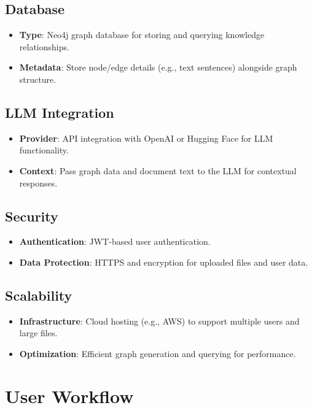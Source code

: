 \documentclass[%
 reprint,
 amsmath,amssymb,
 aps,
]{revtex4-2}
\begin{document}
\subsection{\label{sec:database}Database}
\begin{itemize}
\item \textbf{Type}: Neo4j graph database for storing and querying knowledge relationships.
\item \textbf{Metadata}: Store node/edge details (e.g., text sentences) alongside graph structure.
\end{itemize}

\subsection{\label{sec:llm_integration}LLM Integration}
\begin{itemize}
\item \textbf{Provider}: API integration with OpenAI or Hugging Face for LLM functionality.
\item \textbf{Context}: Pass graph data and document text to the LLM for contextual responses.
\end{itemize}

\subsection{\label{sec:security}Security}
\begin{itemize}
\item \textbf{Authentication}: JWT-based user authentication.
\item \textbf{Data Protection}: HTTPS and encryption for uploaded files and user data.
\end{itemize}

\subsection{\label{sec:scalability}Scalability}
\begin{itemize}
\item \textbf{Infrastructure}: Cloud hosting (e.g., AWS) to support multiple users and large files.
\item \textbf{Optimization}: Efficient graph generation and querying for performance.
\end{itemize}

\section{\label{sec:user_workflow}User Workflow}
\end{document}
